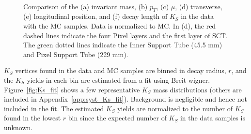 \begin{figure}[!htb]
     \\
    \caption{Comparison of the (a) invariant mass, (b) $p_{T}$, (c) $\mu$, (d) transverse, (e) longitudinal position, and (f) decay length of $K_{S}$ in the data with the MC samples. Data is normalized to MC. In (d), the red dashed lines indicate the four Pixel layers and the first layer of SCT. The green dotted lines indicate the Inner Support Tube (45.5 mm) and Pixel Support Tube (229 mm).}
    \label{fig:Ks_data_MC}
\end{figure}

$K_{S}$ vertices found in the data and MC samples are binned in decay radius, $r$, and the $K_{S}$ yields in each bin are estimated from a fit using Breit-wigner. Figure~\ref{fig:Ks_fit} shows a few representative $K_{S}$ mass distributions (others are included in Appendix~\ref{app:syst_Ks_fit}). Background is negligible and hence not included in the fit. The estimated $K_{S}$ yields are normalized to the number of $K_{S}$ found in the lowest $r$ bin since the expected number of $K_{S}$ in the data samples is unknown. 


